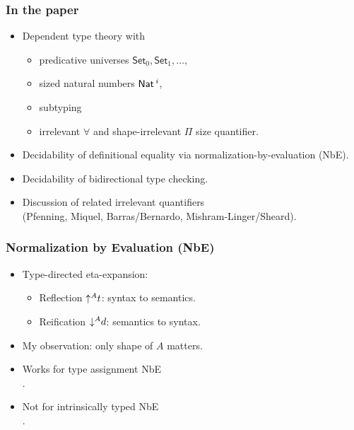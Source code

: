 \documentclass[t,fleqn]{beamer}
\renewcommand{\Set}{\mathsf{Set}}
\newcommand{\cAnn}{\color{red!80!black}}%
\renewcommand{\emph}[1]{{\cAnn#1}}
\begin{document}
\begin{frame}%
  \frametitle{In the paper}
  \begin{itemize}
  \item Dependent type theory with
    \begin{itemize}
    \item predicative universes $\Set_0, \Set_1, \dots$,
    \item sized natural numbers $\mathsf{Nat}\,^i$,
    \item subtyping
    \item irrelevant $\forall$ and shape-irrelevant $\Pi$ size quantifier.
    \end{itemize}
  \item Decidability of definitional equality via
    normalization-by-evaluation (NbE).
  \item Decidability of bidirectional type checking.
  \item Discussion of related irrelevant quantifiers \\
    (Pfenning, Miquel, Barras/Bernardo, Mishram-Linger/Sheard).
  \end{itemize}
\end{frame}



\begin{frame}%
  \frametitle{Normalization by Evaluation (NbE)}
  \begin{itemize}
  \item Type-directed eta-expansion:
    \begin{itemize}
    \item Reflection $\mathord{\uparrow^{A}} t$: syntax to semantics.
    \item Reification $\mathord{\downarrow^{A}} d$: semantics to syntax.
    \end{itemize}
  \item My observation: only \emph{shape} of $A$ matters.
  \item Works for \emph{type assignment} NbE \\ .
  \item Not for \emph{intrinsically typed} NbE \\ .
  \end{itemize}
\end{frame}
\end{document}
